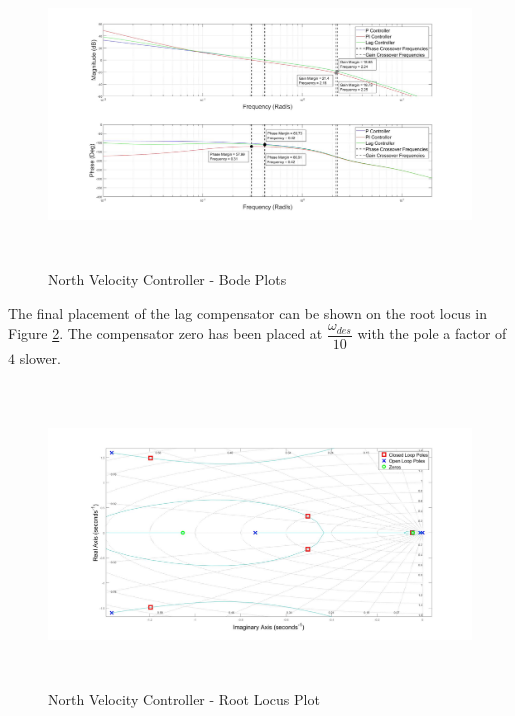 	\begin{figure}[H]
		\centering
		\includegraphics[height = 8cm]{../Design/Matlab/Controllers/north_velocity_bode.jpg}
		\caption{North Velocity Controller -  Bode Plots}
		\label{IM_NorthVelControlBode}
	\end{figure}
	
	The final placement of the lag compensator can be shown on the root locus in Figure \ref{IM_NorthVelControlRoot}. The compensator zero has been placed at $\dfrac{\omega_{des}}{10}$ with the pole a factor of $4$ slower.
	
	\begin{figure}[H]
		\centering
		\includegraphics[height = 8cm]{../Design/Matlab/Controllers/north_velocity_root.jpg}
		\caption{North Velocity Controller -  Root Locus Plot}
		\label{IM_NorthVelControlRoot}
	\end{figure}	
	

